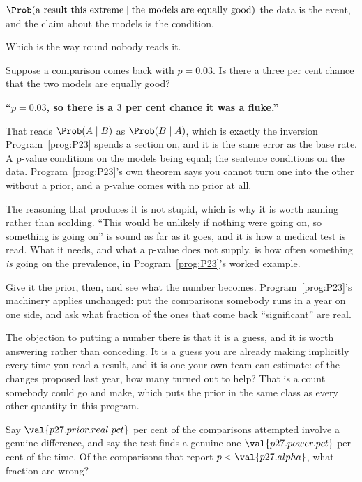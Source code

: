 \begin{fr}
\begin{ansblock}
$\Prob(\text{a result this extreme} \mid \text{the models are equally good})$
\dash{} the data is the event, and the claim about the models is the
condition.
\end{ansblock}

Which is the way round nobody reads it.

Suppose a comparison comes back with $p = \num{0.03}$. Is there a three per
cent chance that the two models are equally good?
\dotline
\nextframe
\end{fr}

\begin{fr}

\begin{trapbox}
\textbf{\enquote{$p = \num{0.03}$, so there is a $3$ per cent chance it was a
fluke.}}

That reads $\Prob(A \mid B)$ as $\Prob(B \mid A)$, which is exactly the
inversion Program~\ref{prog:P23} spends a section on, and it is the same
error as the base rate. A p-value conditions on the models being equal; the
sentence conditions on the data. Program~\ref{prog:P23}'s own theorem says
you cannot turn one into the other without a prior, and a p-value comes with
no prior at all.

The reasoning that produces it is not stupid, which is why it is worth
naming rather than scolding. \enquote{This would be unlikely if nothing were
going on, so something is going on} is sound as far as it goes, and it is how
a medical test is read. What it needs, and what a p-value does not supply,
is how often something \emph{is} going on \dash{} the prevalence, in
Program~\ref{prog:P23}'s worked example.
\end{trapbox}
\end{fr}

\begin{fr}
Give it the prior, then, and see what the number becomes.
Program~\ref{prog:P23}'s machinery applies unchanged: put the comparisons
somebody runs in a year on one side, and ask what fraction of the ones that
come back \enquote{significant} are real.

The objection to putting a number there is that it is a guess, and it is
worth answering rather than conceding. It is a guess you are already making
implicitly every time you read a result, and it is one your own team can
estimate: of the changes proposed last year, how many turned out to help? That
is a count somebody could go and make, which puts the prior in the same class
as every other quantity in this program.

Say $\val{p27.prior.real.pct}$ per cent of the comparisons attempted involve a
genuine difference, and say the test finds a genuine one
$\val{p27.power.pct}$ per cent of the time. Of the comparisons that report
$p < \val{p27.alpha}$, what fraction are wrong?
\dotline
\nextframe
\end{fr}

